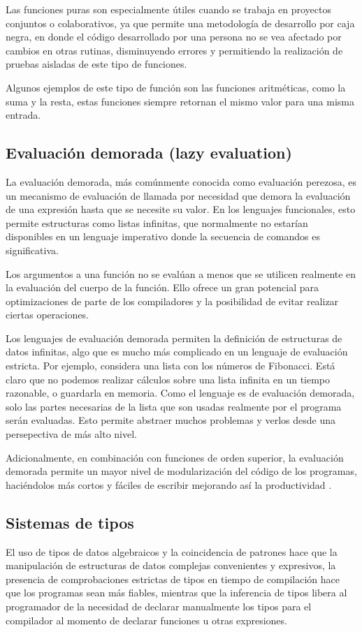 Las funciones puras son especialmente útiles cuando se trabaja en proyectos conjuntos o colaborativos, ya que permite una metodología de desarrollo por caja negra, en donde el código desarrollado por una persona no se vea afectado por cambios en otras rutinas, disminuyendo errores y permitiendo la realización de pruebas aisladas de este tipo de funciones.

Algunos ejemplos de este tipo de función son las funciones aritméticas, como la suma y la resta, estas funciones siempre retornan el mismo valor para una misma entrada.

\subsection{Evaluación demorada (lazy evaluation)}

La evaluación demorada, más comúnmente conocida como evaluación perezosa, es un mecanismo de evaluación de llamada por necesidad que demora la evaluación de una expresión hasta que se necesite su valor. En los lenguajes funcionales, esto permite estructuras como listas infinitas, que normalmente no estarían disponibles en un lenguaje imperativo donde la secuencia de comandos es significativa.

Los argumentos a una función no se evalúan a menos que se utilicen realmente en la evaluación del cuerpo de la función. Ello ofrece un gran potencial para optimizaciones de parte de los compiladores y la posibilidad de evitar realizar ciertas operaciones.

Los lenguajes de evaluación demorada permiten la definición de estructuras de datos infinitas, algo que es mucho más complicado en un lenguaje de evaluación estricta. Por ejemplo, considera una lista con los números de Fibonacci. Está claro que no podemos realizar cálculos sobre una lista infinita en un tiempo razonable, o guardarla en memoria. Como el lenguaje es de evaluación demorada, solo las partes necesarias de la lista que son usadas realmente por el programa serán evaluadas. Esto permite abstraer muchos problemas y verlos desde una persepectiva de más alto nivel.

Adicionalmente, en combinación con funciones de orden superior, la evaluación demorada permite un mayor nivel de modularización del código de los programas, haciéndolos más cortos y fáciles de escribir mejorando así la productividad \cite{hughes1989functional}.

\subsection{Sistemas de tipos}

El uso de tipos de datos algebraicos y la coincidencia de patrones hace que la manipulación de estructuras de datos complejas convenientes y expresivos, la presencia de comprobaciones estrictas de tipos en tiempo de compilación hace que los programas sean más fiables, mientras que la inferencia de tipos libera al programador de la necesidad de declarar manualmente los tipos para el compilador al momento de declarar funciones u otras expresiones.
